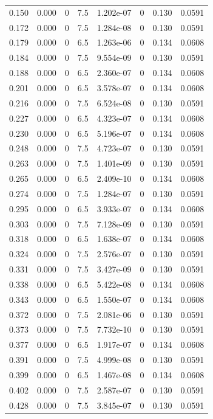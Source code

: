 \documentclass[preview]{standalone}
\begin{document}
{{\begin{tabular}{L{1.2cm}C{1.2cm} C{0.3cm}C{0.5cm} C{1.4cm}C{1.4cm} C{1.4cm}C{1.4cm}}
  0.150  &  0.000  & 0     & 7.5 &  1.202e-07  & 0  & 0.130 &  0.0591   \\ 
  0.172  &  0.000  & 0     & 7.5 &  1.284e-08  & 0  & 0.130 &  0.0591   \\ 
  0.179  &  0.000  & 0     & 6.5 &  1.263e-06  & 0  & 0.134 &  0.0608   \\ 
  0.184  &  0.000  & 0     & 7.5 &  9.554e-09  & 0  & 0.130 &  0.0591   \\ 
  0.188  &  0.000  & 0     & 6.5 &  2.360e-07  & 0  & 0.134 &  0.0608   \\ 
  0.201  &  0.000  & 0     & 6.5 &  3.578e-07  & 0  & 0.134 &  0.0608   \\ 
  0.216  &  0.000  & 0     & 7.5 &  6.524e-08  & 0  & 0.130 &  0.0591   \\ 
  0.227  &  0.000  & 0     & 6.5 &  4.323e-07  & 0  & 0.134 &  0.0608   \\ 
  0.230  &  0.000  & 0     & 6.5 &  5.196e-07  & 0  & 0.134 &  0.0608   \\ 
  0.248  &  0.000  & 0     & 7.5 &  4.723e-07  & 0  & 0.130 &  0.0591   \\ 
  0.263  &  0.000  & 0     & 7.5 &  1.401e-09  & 0  & 0.130 &  0.0591   \\ 
  0.265  &  0.000  & 0     & 6.5 &  2.409e-10  & 0  & 0.134 &  0.0608   \\ 
  0.274  &  0.000  & 0     & 7.5 &  1.284e-07  & 0  & 0.130 &  0.0591   \\ 
  0.295  &  0.000  & 0     & 6.5 &  3.933e-07  & 0  & 0.134 &  0.0608   \\ 
  0.303  &  0.000  & 0     & 7.5 &  7.128e-09  & 0  & 0.130 &  0.0591   \\ 
  0.318  &  0.000  & 0     & 6.5 &  1.638e-07  & 0  & 0.134 &  0.0608   \\ 
  0.324  &  0.000  & 0     & 7.5 &  2.576e-07  & 0  & 0.130 &  0.0591   \\ 
  0.331  &  0.000  & 0     & 7.5 &  3.427e-09  & 0  & 0.130 &  0.0591   \\ 
  0.338  &  0.000  & 0     & 6.5 &  5.422e-08  & 0  & 0.134 &  0.0608   \\ 
  0.343  &  0.000  & 0     & 6.5 &  1.550e-07  & 0  & 0.134 &  0.0608   \\ 
  0.372  &  0.000  & 0     & 7.5 &  2.081e-06  & 0  & 0.130 &  0.0591   \\ 
  0.373  &  0.000  & 0     & 7.5 &  7.732e-10  & 0  & 0.130 &  0.0591   \\ 
  0.377  &  0.000  & 0     & 6.5 &  1.917e-07  & 0  & 0.134 &  0.0608   \\ 
  0.391  &  0.000  & 0     & 7.5 &  4.999e-08  & 0  & 0.130 &  0.0591   \\ 
  0.399  &  0.000  & 0     & 6.5 &  1.467e-08  & 0  & 0.134 &  0.0608   \\ 
  0.402  &  0.000  & 0     & 7.5 &  2.587e-07  & 0  & 0.130 &  0.0591   \\ 
  0.428  &  0.000  & 0     & 7.5 &  3.845e-07  & 0  & 0.130 &  0.0591   \\ 
\hline 
\end{tabular} 

}}
\end{document}
